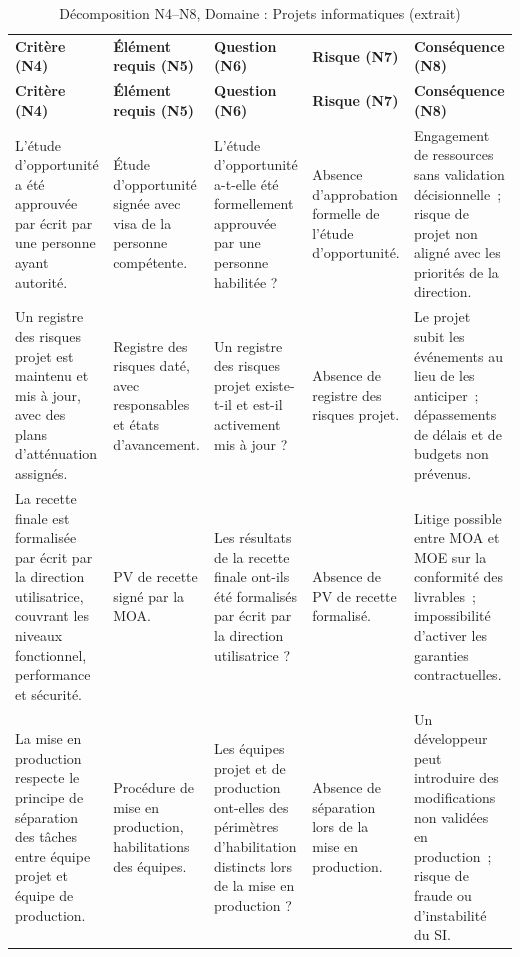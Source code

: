 \begin{longtable}{p{2.3cm}p{2.3cm}p{2.1cm}p{2.0cm}p{2.3cm}}
\small
\caption{Décomposition N4--N8, Domaine : Projets informatiques (extrait)} \\
\toprule
\textbf{Critère (N4)} & \textbf{Élément requis (N5)} & \textbf{Question (N6)} & \textbf{Risque (N7)} & \textbf{Conséquence (N8)} \\
\midrule
\endfirsthead
\toprule
\textbf{Critère (N4)} & \textbf{Élément requis (N5)} & \textbf{Question (N6)} & \textbf{Risque (N7)} & \textbf{Conséquence (N8)} \\
\midrule
\endhead
\bottomrule
\endlastfoot

L'étude d'opportunité a été approuvée par écrit par une personne ayant autorité. &
Étude d'opportunité signée avec visa de la personne compétente. &
L'étude d'opportunité a-t-elle été formellement approuvée par une personne habilitée ? &
Absence d'approbation formelle de l'étude d'opportunité. &
Engagement de ressources sans validation décisionnelle~; risque de projet non aligné avec les priorités de la direction. \\
\addlinespace

Un registre des risques projet est maintenu et mis à jour, avec des plans d'atténuation assignés. &
Registre des risques daté, avec responsables et états d'avancement. &
Un registre des risques projet existe-t-il et est-il activement mis à jour ? &
Absence de registre des risques projet. &
Le projet subit les événements au lieu de les anticiper~; dépassements de délais et de budgets non prévenus. \\
\addlinespace

La recette finale est formalisée par écrit par la direction utilisatrice, couvrant les niveaux fonctionnel, performance et sécurité. &
PV de recette signé par la MOA. &
Les résultats de la recette finale ont-ils été formalisés par écrit par la direction utilisatrice ? &
Absence de PV de recette formalisé. &
Litige possible entre MOA et MOE sur la conformité des livrables~; impossibilité d'activer les garanties contractuelles. \\
\addlinespace

La mise en production respecte le principe de séparation des tâches entre équipe projet et équipe de production. &
Procédure de mise en production, habilitations des équipes. &
Les équipes projet et de production ont-elles des périmètres d'habilitation distincts lors de la mise en production ? &
Absence de séparation lors de la mise en production. &
Un développeur peut introduire des modifications non validées en production~; risque de fraude ou d'instabilité du SI. \\

\end{longtable}


